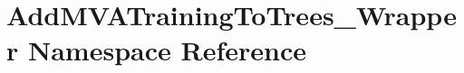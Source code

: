 \hypertarget{namespaceAddMVATrainingToTrees__Wrapper}{
\section{AddMVATrainingToTrees\_\-Wrapper Namespace Reference}
\label{namespaceAddMVATrainingToTrees__Wrapper}
}
